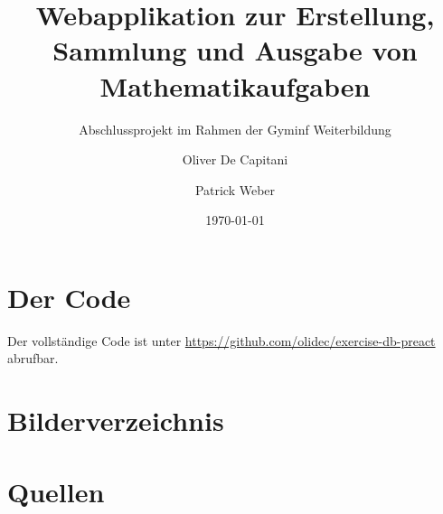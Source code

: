 \documentclass[12pt,a4paper]{scrartcl} %
\title{Webapplikation zur Erstellung, Sammlung und Ausgabe von Mathematikaufgaben}
\subtitle{Abschlussprojekt im Rahmen der Gyminf Weiterbildung}
\date{\today}
\author{Oliver De Capitani \and Patrick Weber}
\begin{document}
\maketitle %
% 



\newpage %
\tableofcontents %

\newpage


\newpage

 

 \newpage

 


\newpage



% 

\newpage



\newpage



\newpage
   
  
\appendix
\section{Der Code}

Der vollständige Code ist unter \url{https://github.com/olidec/exercise-db-preact} abrufbar. 
\newpage





\section{Bilderverzeichnis}
\listoffigures

 

\newpage
\section{Quellen}
\end{document}
